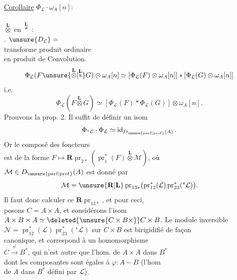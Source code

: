 \uline{Corollaire}  $\Phi_{\mathcal L}\cdot\omega_A[n]:$ \\
\\
$\overset{\mathbf L}{\otimes}$ en $\overset{\mathbf L}{*}$ : \\
. $\unsure{D_{\mathcal L}}=$ \\
 transforme produit ordinaire\\
en  produit de Convolution.
\[
\Phi_{\mathcal L}(F\unsure{\overset{\mathbf L}{\otimes}|\overset{\mathbf L}{*}}G)\otimes\omega_A[n]
\simeq[\Phi_{\mathcal L}(F)\otimes\omega_A[n]]*[\Phi_{\mathcal L}(G)\otimes\omega_A[n]]
\]
i.e.
\[
\Phi_{\mathcal L}(F\overset{\mathbf L}{\otimes}G)\simeq[\Phi_{\mathcal L}(F)*\Phi_{\mathcal L}(G)]\otimes\omega_A[n].
\]
Prouvons la prop. 2. Il suffit de définir un isom
\[
\Phi_{{}^s\mathcal L}\cdot\Phi_{\mathcal L}\simeq\operatorname{id}_{D_{\unsure{\mathrm{parf}|\mathrm{prof}}}(A)}.
\]
Or le composé des foncteurs\\
est de la forme $F\longmapsto\mathbf R\operatorname{pr}_{2*}(\operatorname{pr}_1^*(F)\overset{\mathbf L}{\otimes}\mathcal M)$, où\\
$\mathcal M\in D_{\unsure{\mathrm{parf}|\mathrm{prof}}}(A)$ est donné par
\[
\mathcal M=\unsure{\mathbf R|\mathbf L}\operatorname{pr}_{13*}\bigl(\operatorname{pr}_{12}^*(\mathcal L)\operatorname{pr}_{23}^*({}^s\mathcal L)\bigr).
\]
Il faut donc calculer ce $\mathbf R\operatorname{pr}_{13*}$, et pour ceci,\\
posons $C=A\times A$, et considérons l'isom\\
$A\times B\times A\simeq\deleted{\unsure{C\times B\times}}C\times B$. Le module inversible\\
$\mathcal N=\operatorname{pr}_{12}^*(\mathcal L)\operatorname{pr}_{23}^*({}^s\mathcal L)$ sur $C\times B$ est  birigidifié de façon\\
canonique, et correspond à un homomorphisme\\
$C\xrightarrow{\psi}B^*$, qui n'est autre que l'hom. de $A\times A$ dans $B^*$\\
dont les  composantes sont égales à $\varphi:A\mathbin{-}B$ (l'hom\\
de $A$ dans $B^*$ défini par $\mathcal L$).

